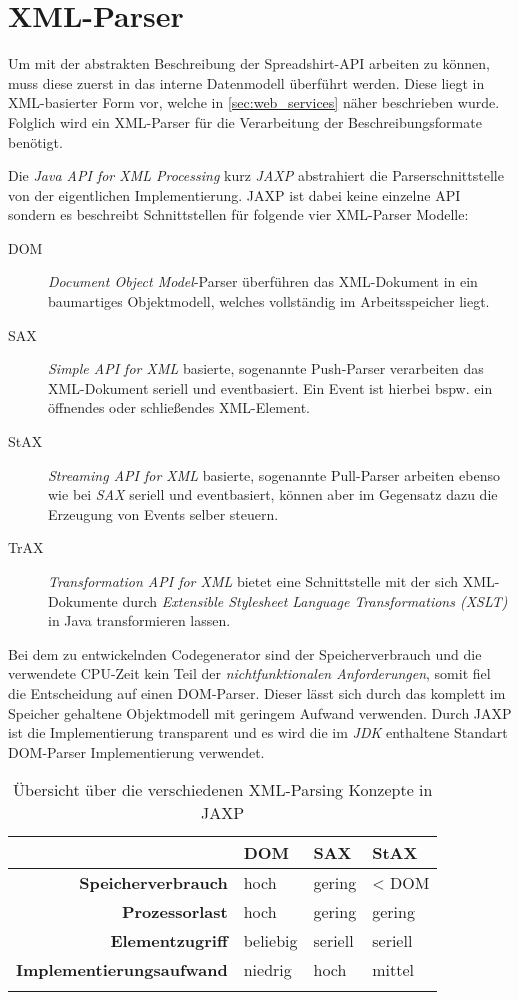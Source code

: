 \section{XML-Parser}
\label{sec:xml_parser}

Um mit der abstrakten Beschreibung der Spreadshirt-API arbeiten zu können, muss diese zuerst in das interne Datenmodell überführt werden. Diese liegt in XML-basierter Form vor, welche in \cref{sec:web_services} näher beschrieben wurde. Folglich wird ein XML-Parser für die Verarbeitung der Beschreibungsformate benötigt.  

Die \emph{Java API for XML Processing} kurz \emph{JAXP} abstrahiert die Parserschnittstelle von der eigentlichen Implementierung. JAXP ist dabei keine einzelne API sondern es beschreibt Schnittstellen für folgende vier XML-Parser Modelle:

\begin{description}
    \item[DOM] \emph{Document Object Model}-Parser überführen das XML-Dokument in ein baumartiges Objektmodell, welches vollständig im Arbeitsspeicher liegt.
    \item[SAX] \emph{Simple API for XML} basierte, sogenannte Push-Parser verarbeiten das XML-Dokument seriell und eventbasiert. Ein Event ist hierbei bspw. ein öffnendes oder schließendes XML-Element.
    \item[StAX] \emph{Streaming API for XML} basierte, sogenannte Pull-Parser arbeiten ebenso wie bei \emph{SAX} seriell und eventbasiert, können aber im Gegensatz dazu die Erzeugung von Events selber steuern. 
    \item[TrAX] \emph{Transformation API for XML} bietet eine Schnittstelle mit der sich XML-Dokumente durch \emph{Extensible Stylesheet Language Transformations (XSLT)} in Java transformieren lassen.
\end{description}

Bei dem zu entwickelnden Codegenerator sind der Speicherverbrauch und die verwendete CPU-Zeit kein Teil der \emph{nichtfunktionalen Anforderungen}, somit fiel die Entscheidung auf einen DOM-Parser. Dieser lässt sich durch das komplett im Speicher gehaltene Objektmodell mit geringem Aufwand verwenden. Durch JAXP ist die Implementierung transparent und es wird die im \emph{JDK} enthaltene Standart DOM-Parser Implementierung verwendet.

\begin{longtable}[tb]{r l l l}
    \toprule
    \rowcolor{lightgray}
    & \textbf{DOM}   & \textbf{SAX}   & \textbf{StAX} \\
    \midrule
    \textbf{Speicherverbrauch} & hoch & gering & \textless{} DOM\\
    \textbf{Prozessorlast} & hoch & gering & gering \\
    \textbf{Elementzugriff} & beliebig & seriell & seriell \\
    \textbf{Implementierungsaufwand} & niedrig & hoch & mittel \\
    \bottomrule
    \caption{Übersicht über die verschiedenen XML-Parsing Konzepte in JAXP}
    \label{tab:xmlParsingModels}
\end{longtable}
